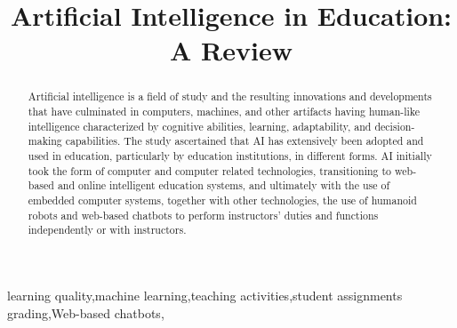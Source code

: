 \documentclass[conference]{IEEEtran}
\begin{document}
\title{Artificial Intelligence in Education: A Review}


\author{
\and
{}
\and
{}
}

\maketitle

\begin{abstract}
Artificial intelligence is a field of study and the resulting innovations and developments that have culminated in computers, machines, and other artifacts having human-like intelligence characterized by cognitive abilities, learning, adaptability, and decision-making capabilities. The study ascertained that AI has extensively been adopted and used in education, particularly by education institutions, in different forms. AI initially took the form of computer and computer related technologies, transitioning to web-based and online intelligent education systems, and ultimately with the use of embedded computer systems, together with other technologies, the use of humanoid robots and web-based chatbots to perform instructors' duties and functions independently or with instructors.
\end{abstract}
\vspace{3 mm}
\begin{IEEEkeywords}
learning quality,machine learning,teaching activities,student assignments grading,Web-based chatbots,
\end{IEEEkeywords}
\end{document}
